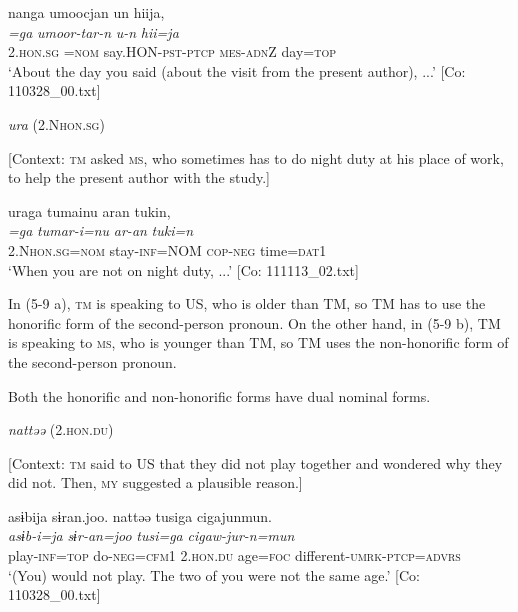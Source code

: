 \glll  nanga  umoocjan  un  hiija,\\
\textit{=ga}  \textit{umoor-tar-n}  \textit{u-n}  \textit{hii=ja}\\
2.\textsc{hon}.\textsc{sg} =\textsc{nom}  say.HON-\textsc{pst}-\textsc{ptcp}  \textsc{mes}-\textsc{adn}Z  day=\textsc{top}\\
\glt ‘About the day you said (about the visit from the present author), ...’ [Co: 110328\_00.txt]

 \ex \label{ex:5:b} \textit{ura} (2.N\textsc{hon}.\textsc{sg})

    [Context: \textsc{tm} asked \textsc{ms}, who sometimes has to do night duty at his place of work, to help the present author with the study.]

\glll  uraga  tumainu  aran  tukin,\\
\textit{=ga}  \textit{tumar-i=nu}  \textit{ar-an}  \textit{tuki=n}\\
2.N\textsc{hon}.\textsc{sg}=\textsc{nom}  stay-\textsc{inf}=NOM  \textsc{cop}-\textsc{neg}  time=\textsc{dat}1\\
\glt ‘When you are not on night duty, ...’ [Co: 111113\_02.txt]
\z
\z

In (5-9 a), \textsc{tm} is speaking to US, who is older than TM, so TM has to use the honorific form of the second-person pronoun. On the other hand, in (5-9 b), TM is speaking to \textsc{ms}, who is younger than TM, so TM uses the non-honorific form of the second-person pronoun.

  Both the honorific and non-honorific forms have dual nominal forms.

\ea \label{ex:5:10}  \ea \label{ex:5:10a} \textit{nattəə} (2.\textsc{hon}.\textsc{du})

    [Context: \textsc{tm} said to US that they did not play together and wondered why they did not. Then, \textsc{my} suggested a plausible reason.]

\glll  asɨbija  sɨran.joo.  nattəə  tusiga   cigajunmun.\\
\textit{asɨb-i=ja}  \textit{sɨr-an=joo}  \textit{}  \textit{tusi=ga}  \textit{cigaw-jur-n=mun}\\
play-\textsc{inf}=\textsc{top}  do-\textsc{neg}=\textsc{cfm}1  2.\textsc{hon}.\textsc{du}  age=\textsc{foc}  different-\textsc{umrk}-\textsc{ptcp}=\textsc{advrs}\\
\glt ‘(You) would not play. The two of you were not the same age.’ [Co: 110328\_00.txt]

